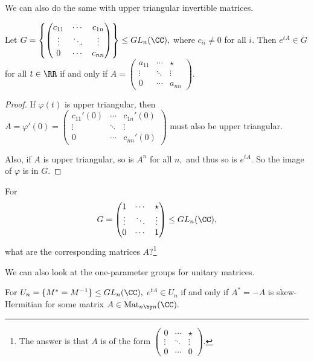 We can also do the same with upper triangular invertible matrices. 
\begin{example}
Let $G = \left\{\begin{pmatrix} c_{11} & \cdots & c_{1n} \\ \vdots & \ddots & \vdots \\ 0 & \cdots & c_{nn} \end{pmatrix}\right\} \leq GL_n(\CC),$ where $c_{ii} \neq 0$ for all $i.$ Then $e^{tA} \in G$ for all $t \in \RR$ if and only if $A = \begin{pmatrix} a_{11} & \cdots & \star \\ \vdots & \ddots & \vdots \\ 0 & \cdots & a_{nn} \end{pmatrix}$. 
\end{example}

\begin{proof}
If $\varphi(t)$ is upper triangular, then $A = \varphi'(0) = \begin{pmatrix} c_{11}'(0) & \cdots & c_{1n}'(0) \\ \vdots & \ddots & \vdots \\ 0 & \cdots & c_{nn}'(0) \end{pmatrix}$ must also be upper triangular. 

Also, if $A$ is upper triangular, so is $A^n$ for all $n,$ and thus so is $e^{tA}.$ So the image of $\varphi$ is in $G.$
\end{proof}

\begin{problem}
For \[G = \begin{pmatrix} 1 & \cdots & \star \\ \vdots & \ddots & \vdots \\ 0 & \cdots & 1 \end{pmatrix} \leq GL_n(\CC),\] what are the corresponding matrices $A?$\footnote{The answer is that $A$ is of the form $\begin{pmatrix} 0 & \cdots & \star \\ \vdots & \ddots & \vdots \\ 0 & \cdots & 0 \end{pmatrix}$.}
\end{problem}

We can also look at the one-parameter groups for unitary matrices. 
\begin{example}
For $U_n = \{M^* = M^{-1}\} \leq GL_n(\CC),$ $e^{tA} \in U_n$ if and only if $A^* = -A$ is skew-Hermitian for some matrix $A \in \text{Mat}_{n \by n}(\CC).$ 
\end{example}

